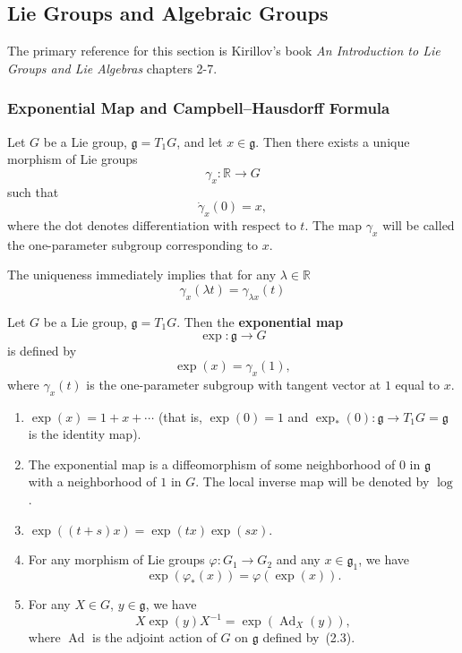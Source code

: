 \documentclass[12pt]{article}
\begin{document}
\subsection{Lie Groups and Algebraic Groups}The primary reference for this section is Kirillov's book \textit{An Introduction to Lie Groups and Lie Algebras} chapters 2-7.

\subsubsection{Exponential Map and Campbell--Hausdorff Formula}
\begin{proposition}
    Let $G$ be a Lie group, $\mathfrak g = T_1G$, and let $x\in \mathfrak g$. Then there exists a unique
    morphism of Lie groups
    \[
        \gamma_x \colon \mathbb R \to G
    \]
    such that
    \[
        \dot\gamma_x(0)=x,
    \]
    where the dot denotes differentiation with respect to $t$. The map $\gamma_x$ will be called the
    one-parameter subgroup corresponding to $x$.
\end{proposition}

The uniqueness immediately implies that for any $\lambda\in \mathbb R$
\[
    \gamma_x(\lambda t)=\gamma_{\lambda x}(t)
\]
\begin{definition}
    Let $G$ be a Lie group, $\mathfrak g=T_1G$. Then the \textbf{exponential map}
    \[
        \exp \colon \mathfrak g \to G
    \]
    is defined by
    \[
        \exp(x)=\gamma_x(1),
    \]
    where $\gamma_x(t)$ is the one-parameter subgroup with tangent vector at $1$ equal to $x$.
\end{definition}

\begin{theorem}
    \leavevmode
    \begin{enumerate}
        \item $\exp(x)=1+x+\cdots$ (that is, $\exp(0)=1$ and
              $\exp_*(0)\colon \mathfrak g \to T_1G=\mathfrak g$ is the identity map).

        \item The exponential map is a diffeomorphism of some neighborhood of $0$ in $\mathfrak g$
              with a neighborhood of $1$ in $G$. The local inverse map will be denoted by $\log$.

        \item $\exp((t+s)x)=\exp(tx)\exp(sx)$.

        \item For any morphism of Lie groups $\varphi\colon G_1 \to G_2$ and any
              $x\in \mathfrak g_1$, we have
              \[
                  \exp(\varphi_*(x))=\varphi(\exp(x)).
              \]

        \item For any $X\in G$, $y\in \mathfrak g$, we have
              \[
                  X\exp(y)X^{-1}=\exp(\operatorname{Ad}_X(y)),
              \]
              where $\operatorname{Ad}$ is the adjoint action of $G$ on $\mathfrak g$
              defined by~(2.3).
    \end{enumerate}
\end{theorem}
\end{document}
